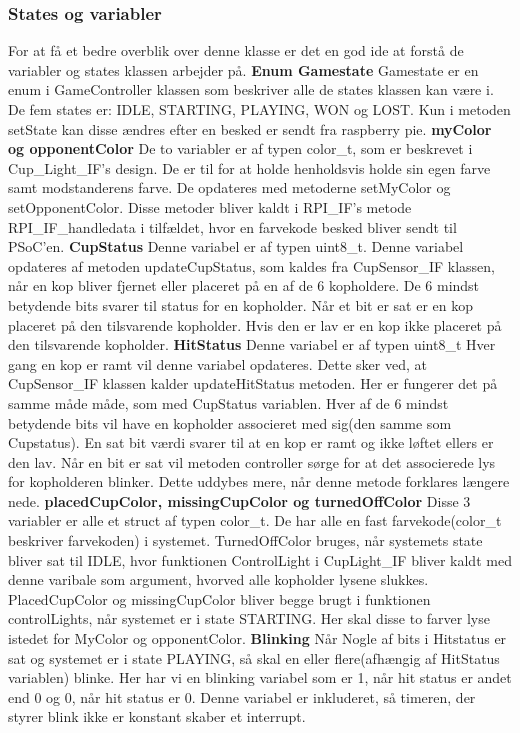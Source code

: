 \documentclass[Softwaredesign/Softwaredesign_main.tex]{subfiles}
\begin{document}
\subsubsection{States og variabler}
For at få et bedre overblik over denne klasse er det en god ide at forstå de variabler og states klassen arbejder på.
\textbf{Enum Gamestate}
Gamestate er en enum i GameController klassen som beskriver alle de states klassen kan være i. De fem states er: IDLE, STARTING, PLAYING, WON og LOST. Kun i metoden setState kan disse ændres efter en besked er sendt fra raspberry pie.
\textbf{myColor og opponentColor}
De to variabler er af typen color\_t, som er beskrevet i Cup\_Light\_IF's design. De er til for at holde henholdsvis holde sin egen farve samt modstanderens farve. De opdateres med metoderne setMyColor og setOpponentColor. Disse metoder bliver kaldt i RPI\_IF's metode RPI\_IF\_handledata i tilfældet, hvor en farvekode besked bliver sendt til PSoC'en. 
\textbf{CupStatus}
Denne variabel er af typen uint8\_t. Denne variabel opdateres af metoden updateCupStatus, som kaldes fra CupSensor\_IF klassen, når en kop bliver fjernet eller placeret på en af de 6 kopholdere. De 6 mindst betydende bits svarer til status for en kopholder. Når et bit er sat er en kop placeret på den tilsvarende kopholder. Hvis den er lav er en kop ikke placeret på den tilsvarende kopholder. 
\textbf{HitStatus}
Denne variabel er af typen uint8\_t Hver gang en kop er ramt vil denne variabel opdateres. Dette sker ved, at CupSensor\_IF klassen kalder updateHitStatus metoden. Her er fungerer det på samme måde måde, som med CupStatus variablen. Hver af de 6 mindst betydende bits vil have en kopholder associeret med sig(den samme som Cupstatus). En sat bit værdi svarer til at en kop er ramt og ikke løftet ellers er den lav. Når en bit er sat vil metoden controller sørge for at det associerede lys for kopholderen blinker. Dette uddybes mere, når denne metode forklares længere nede.
\textbf{placedCupColor, missingCupColor og turnedOffColor}
Disse 3 variabler er alle et struct af typen color\_t. De har alle en fast farvekode(color\_t beskriver farvekoden) i systemet. TurnedOffColor bruges, når systemets state bliver sat til IDLE, hvor funktionen ControlLight i CupLight\_IF bliver kaldt med denne varibale som argument, hvorved alle kopholder lysene slukkes. PlacedCupColor og missingCupColor bliver begge brugt i funktionen controlLights, når systemet er i state STARTING. Her skal disse to farver lyse istedet for MyColor og opponentColor.
\textbf{Blinking}
Når Nogle af bits i Hitstatus er sat og systemet er i state PLAYING, så skal en eller flere(afhængig af HitStatus variablen) blinke. Her har vi en blinking variabel som er 1, når hit status er andet end 0 og 0, når hit status er 0. Denne variabel er inkluderet, så timeren, der styrer blink ikke er konstant skaber et interrupt.
\end{document}
